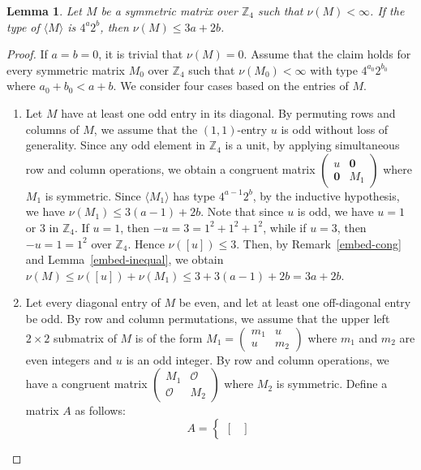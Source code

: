 \documentclass{article}
\newtheorem{lemma}[theorem]{Lemma}
\theoremstyle{definition}
\theoremstyle{remark}
\begin{document}
\begin{lemma}\label{embed-upper}
    Let $M$ be a symmetric matrix over $\mathbb{Z}_4$ such that $\nu(M)<\infty$. If the type of $\langle M\rangle$ is $4^a2^b$, then $\nu(M)\le 3a+2b$.
\end{lemma}
\begin{proof}
    If $a=b=0$, it is trivial that $\nu(M)=0$. Assume that the claim holds for every symmetric matrix $M_0$ over $\mathbb{Z}_4$ such that $\nu(M_0)<\infty$ with type $4^{a_0}2^{b_0}$ where $a_0+b_0<a+b$. We consider four cases based on the entries of $M$.
    \begin{enumerate}
        \item[(i)] Let $M$ have at least one odd entry in its diagonal. By permuting rows and columns of $M$, we assume that the $(1, 1)$-entry $u$ is odd without loss of generality. Since any odd element in $\mathbb{Z}_4$ is a unit, by applying simultaneous row and column operations, we obtain a congruent matrix
        $\begin{pmatrix}
            u & \mathbf{0}\\\mathbf{0} & M_1
        \end{pmatrix}$
        where $M_1$ is symmetric. Since $\langle M_1\rangle$ has type $4^{a-1}2^b$, by the inductive hypothesis, we have $\nu(M_1)\le 3(a-1)+2b$. Note that since $u$ is odd, we have $u=1$ or $3$ in $\mathbb Z_4$. If $u=1$, then $-u=3=1^2+1^2+1^2$, while if $u=3$, then $-u=1=1^2$ over $\mathbb Z_4$. Hence $\nu([u])\le 3$. Then, by Remark~\ref{embed-cong} and Lemma~\ref{embed-inequal}, we obtain $\nu(M)\le \nu([u])+\nu(M_1)\le 3+3(a-1)+2b=3a+2b$.
        \item[(ii)] Let every diagonal entry of $M$ be even, and let at least one off-diagonal entry be odd. By row and column permutations, we assume that the upper left $2\times 2$ submatrix of $M$ is of the form
        $M_1=\begin{pmatrix}
            m_1 & u\\u & m_2
        \end{pmatrix}$
        where $m_1$ and $m_2$ are even integers and $u$ is an odd integer. By row and column operations, we have a congruent matrix $\begin{pmatrix} M_1 & \mathcal{O}\\\mathcal{O} & M_2\end{pmatrix}$ where $M_2$ is symmetric. Define a matrix $A$ as follows:
        \[
        A=\begin{cases}
            \begin{bmatrix}

\end{bmatrix}
\end{cases}\]
\end{enumerate}
\end{proof}
\end{document}
